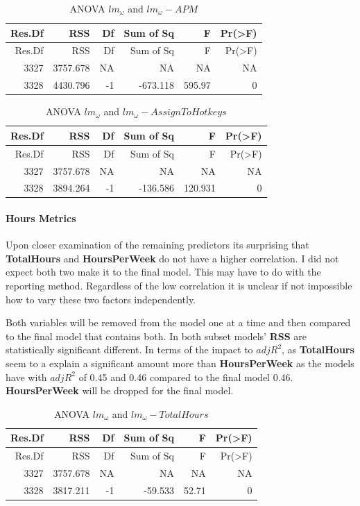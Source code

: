 \documentclass[]{article}
\let\oldparagraph\paragraph
\renewcommand{\paragraph}[1]{\oldparagraph{#1}\mbox{}}
\begin{document}
\begin{longtable}[]{@{}rrrrrr@{}}
\caption{ANOVA \(lm_\omega\) and \(lm_\omega-APM\)}\tabularnewline
\toprule
Res.Df & RSS & Df & Sum of Sq & F & Pr(\textgreater{}F)\tabularnewline
\midrule
\endfirsthead
\toprule
Res.Df & RSS & Df & Sum of Sq & F & Pr(\textgreater{}F)\tabularnewline
\midrule
\endhead
3327 & 3757.678 & NA & NA & NA & NA\tabularnewline
3328 & 4430.796 & -1 & -673.118 & 595.97 & 0\tabularnewline
\bottomrule
\end{longtable}

\begin{longtable}[]{@{}rrrrrr@{}}
\caption{ANOVA \(lm_\omega\) and
\(lm_\omega-AssignToHotkeys\)}\tabularnewline
\toprule
Res.Df & RSS & Df & Sum of Sq & F & Pr(\textgreater{}F)\tabularnewline
\midrule
\endfirsthead
\toprule
Res.Df & RSS & Df & Sum of Sq & F & Pr(\textgreater{}F)\tabularnewline
\midrule
\endhead
3327 & 3757.678 & NA & NA & NA & NA\tabularnewline
3328 & 3894.264 & -1 & -136.586 & 120.931 & 0\tabularnewline
\bottomrule
\end{longtable}

\hypertarget{hours-metrics}{%
\paragraph{Hours Metrics}\label{hours-metrics}}

Upon closer examination of the remaining predictors its surprising that
\textbf{TotalHours} and \textbf{HoursPerWeek} do not have a higher
correlation. I did not expect both two make it to the final model. This
may have to do with the reporting method. Regardless of the low
correlation it is unclear if not impossible how to vary these two
factors independently.

Both variables will be removed from the model one at a time and then
compared to the final model that contains both. In both subset models'
\textbf{RSS} are statistically significant different. In terms of the
impact to \(adjR^2\), as \textbf{TotalHours} seem to a explain a
significant amount more than \textbf{HoursPerWeek} as the models have
with \(adjR^2\) of 0.45 and 0.46 compared to the final model 0.46.
\textbf{HoursPerWeek} will be dropped for the final model.

\begin{longtable}[]{@{}rrrrrr@{}}
\caption{ANOVA \(lm_\omega\) and
\(lm_\omega-TotalHours\)}\tabularnewline
\toprule
Res.Df & RSS & Df & Sum of Sq & F & Pr(\textgreater{}F)\tabularnewline
\midrule
\endfirsthead
\toprule
Res.Df & RSS & Df & Sum of Sq & F & Pr(\textgreater{}F)\tabularnewline
\midrule
\endhead
3327 & 3757.678 & NA & NA & NA & NA\tabularnewline
3328 & 3817.211 & -1 & -59.533 & 52.71 & 0\tabularnewline
\bottomrule
\end{longtable}
\end{document}
